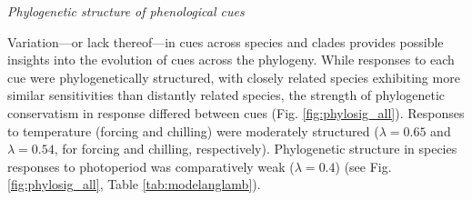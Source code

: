 \documentclass[11pt]{article}
\begin{document}
\emph{Phylogenetic structure of phenological cues}

Variation---or lack thereof---in cues across species and clades provides possible insights into the evolution of cues across the phylogeny. While responses to each cue were phylogenetically structured, with closely related species exhibiting more similar sensitivities than distantly related species, the strength of phylogenetic conservatism in response differed between cues (Fig. \ref{fig:phylosig_all}). Responses to temperature (forcing and chilling) were moderately structured ($\lambda = 0.65$ and $\lambda = 0.54$, for forcing and chilling, respectively). Phylogenetic structure in species responses to photoperiod was comparatively weak ($\lambda= 0.4$) (see Fig. \ref{fig:phylosig_all}, Table \ref{tab:modelanglamb}). %
\end{document}
